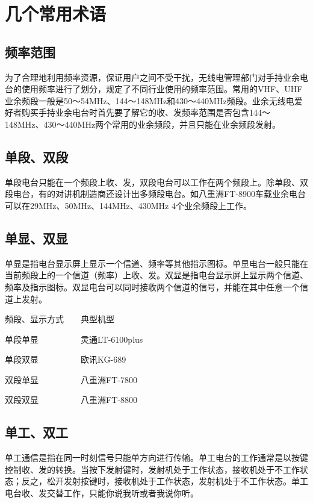\documentclass[12pt,UTF8]{ctexbook}
\begin{document}
\section{几个常用术语}

\subsection{频率范围}

为了合理地利用频率资源，保证用户之间不受干扰，无线电管理部门对手持业余电台的使用频率进行了划分，规定了不同行业使用的频率范围。常用的VHF、UHF业余频段一般是50～54MHz、144～148MHz和430～440MHz频段。业余无线电爱好者购买手持业余电台时首先要了解它的收、发频率范围是否包含144～148MHz、430～440MHz两个常用的业余频段，并且只能在业余频段发射。

\subsection{单段、双段}

单段电台只能在一个频段上收、发，双段电台可以工作在两个频段上。除单段、双段电台，有的对讲机制造商还设计出多频段电台。如八重洲FT-8900车载业余电台可以在29MHz、50MHz、144MHz、430MHz 4个业余频段上工作。

\subsection{单显、双显}

单显是指电台显示屏上显示一个信道、频率等其他指示图标。单显电台一般只能在当前频段上的一个信道（频率）上收、发。双显是指电台显示屏上显示两个信道、频率及指示图标。双显电台可以同时接收两个信道的信号，并能在其中任意一个信道上发射。

频段、显示方式　　典型机型

单段单显　　　　　灵通LT-6100plus

单段双显　　　　　欧讯KG-689

双段单显　　　　　八重洲FT-7800

双段双显　　　　　八重洲FT-8800

\subsection{单工、双工}

单工通信是指在同一时刻信号只能单方向进行传输。单工电台的工作通常是以按键控制收、发的转换。当按下发射键时，发射机处于工作状态，接收机处于不工作状态；反之，松开发射按键时，接收机处于工作状态，发射机处于不工作状态。单工电台收、发交替工作，只能你说我听或者我说你听。
\end{document}

